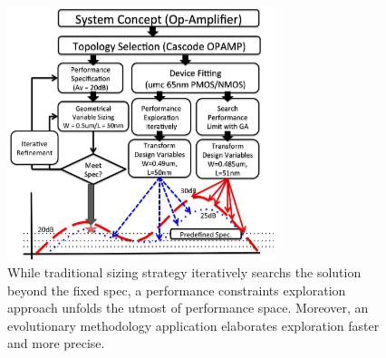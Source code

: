       \begin{figure}[ht]
        \centerline{
        \includegraphics[width=0.7\textwidth]{Fig/Introduction/PerfCons.eps}}
        \caption{While traditional sizing strategy iteratively searchs the solution beyond the fixed spec, a performance constraints exploration approach unfolds the utmost of performance space. Moreover, an evolutionary methodology application elaborates exploration faster and more precise.} 
        \label{fig:PerfOptimal}
      \end{figure}

